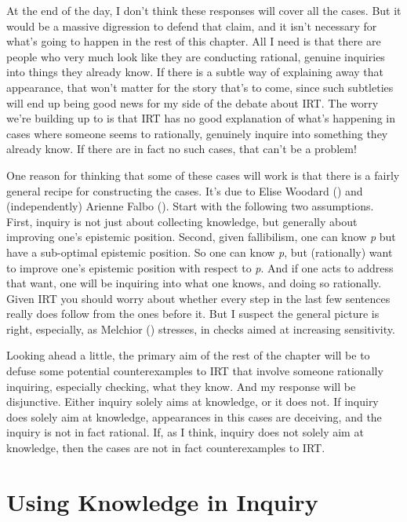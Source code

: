 \documentclass[
  12pt,
  letterpaper,
]{scrbook}
\begin{document}
At the end of the day, I don't think these responses will cover all the
cases. But it would be a massive digression to defend that claim, and it
isn't necessary for what's going to happen in the rest of this chapter.
All I need is that there are people who very much look like they are
conducting rational, genuine inquiries into things they already know. If
there is a subtle way of explaining away that appearance, that won't
matter for the story that's to come, since such subtleties will end up
being good news for my side of the debate about IRT. The worry we're
building up to is that IRT has no good explanation of what's happening
in cases where someone seems to rationally, genuinely inquire into
something they already know. If there are in fact no such cases, that
can't be a problem!

One reason for thinking that some of these cases will work is that there
is a fairly general recipe for constructing the cases. It's due to Elise
Woodard () and (independently) Arienne
Falbo (). Start with the following two
assumptions. First, inquiry is not just about collecting knowledge, but
generally about improving one's epistemic position. Second, given
fallibilism, one can know \emph{p} but have a sub-optimal epistemic
position. So one can know \emph{p}, but (rationally) want to improve
one's epistemic position with respect to \emph{p}. And if one acts to
address that want, one will be inquiring into what one knows, and doing
so rationally. Given IRT you should worry about whether every step in
the last few sentences really does follow from the ones before it. But I
suspect the general picture is right, especially, as Melchior
() stresses, in checks aimed at
increasing sensitivity.

Looking ahead a little, the primary aim of the rest of the chapter will
be to defuse some potential counterexamples to IRT that involve someone
rationally inquiring, especially checking, what they know. And my
response will be disjunctive. Either inquiry solely aims at knowledge,
or it does not. If inquiry does solely aim at knowledge, appearances in
this cases are deceiving, and the inquiry is not in fact rational. If,
as I think, inquiry does not solely aim at knowledge, then the cases are
not in fact counterexamples to IRT.

\section{Using Knowledge in Inquiry}\label{sec-irtinquiry}
\end{document}
